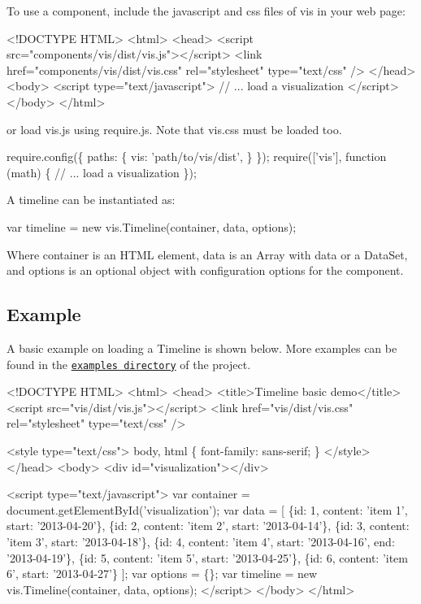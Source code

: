 To use a component, include the javascript and css files of vis in your web page\+:


\begin{DoxyCode}
<!DOCTYPE HTML>
<html>
<head>
  <script src="components/vis/dist/vis.js"></script>
  <link href="components/vis/dist/vis.css" rel="stylesheet" type="text/css" />
</head>
<body>
  <script type="text/javascript">
    // ... load a visualization
  </script>
</body>
</html>
\end{DoxyCode}


or load vis.\+js using require.\+js. Note that vis.\+css must be loaded too.


\begin{DoxyCode}
require.config(\{
  paths: \{
    vis: 'path/to/vis/dist',
  \}
\});
require(['vis'], function (math) \{
  // ... load a visualization
\});
\end{DoxyCode}


A timeline can be instantiated as\+:


\begin{DoxyCode}
var timeline = new vis.Timeline(container, data, options);
\end{DoxyCode}


Where {\ttfamily container} is an H\+T\+ML element, {\ttfamily data} is an Array with data or a Data\+Set, and {\ttfamily options} is an optional object with configuration options for the component.

\subsection*{Example}

A basic example on loading a Timeline is shown below. More examples can be found in the \href{https://github.com/almende/vis/tree/master/examples}{\tt examples directory} of the project.


\begin{DoxyCode}
<!DOCTYPE HTML>
<html>
<head>
  <title>Timeline basic demo</title>
  <script src="vis/dist/vis.js"></script>
  <link href="vis/dist/vis.css" rel="stylesheet" type="text/css" />

  <style type="text/css">
    body, html \{
      font-family: sans-serif;
    \}
  </style>
</head>
<body>
<div id="visualization"></div>

<script type="text/javascript">
  var container = document.getElementById('visualization');
  var data = [
    \{id: 1, content: 'item 1', start: '2013-04-20'\},
    \{id: 2, content: 'item 2', start: '2013-04-14'\},
    \{id: 3, content: 'item 3', start: '2013-04-18'\},
    \{id: 4, content: 'item 4', start: '2013-04-16', end: '2013-04-19'\},
    \{id: 5, content: 'item 5', start: '2013-04-25'\},
    \{id: 6, content: 'item 6', start: '2013-04-27'\}
  ];
  var options = \{\};
  var timeline = new vis.Timeline(container, data, options);
</script>
</body>
</html>
\end{DoxyCode}


